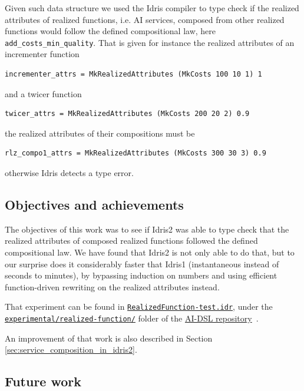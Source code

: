 \documentclass[]{report}
\begin{document}
Given such data structure we used the Idris compiler to type check if
the realized attributes of realized functions, i.e. AI services,
composed from other realized functions would follow the defined
compositional law, here \texttt{add\_costs\_min\_quality}.  That is given
for instance the realized attributes of an incrementer function
\begin{verbatim}
incrementer_attrs = MkRealizedAttributes (MkCosts 100 10 1) 1
\end{verbatim}
and a twicer function
\begin{verbatim}
twicer_attrs = MkRealizedAttributes (MkCosts 200 20 2) 0.9
\end{verbatim}
the realized attributes of their compositions must be
\begin{verbatim}
rlz_compo1_attrs = MkRealizedAttributes (MkCosts 300 30 3) 0.9
\end{verbatim}
otherwise Idris detects a type error.

\subsection{Objectives and achievements}

The objectives of this work was to see if Idris2 was able to type
check that the realized attributes of composed realized functions
followed the defined compositional law.  We have found that Idris2 is
not only able to do that, but to our surprise does it considerably
faster that Idris1 (instantaneous instead of seconds to minutes), by
bypassing induction on numbers and using efficient function-driven
rewriting on the realized attributes instead.

That experiment can be found in
\href{https://github.com/singnet/ai-dsl/blob/master/experimental/realized-function/RealizedFunction-test.idr}{\texttt{RealizedFunction-test.idr}},
under the
\href{https://github.com/singnet/ai-dsl/blob/master/experimental/realized-function/}{\texttt{experimental/realized-function/}}
folder of the \href{https://github.com/singnet/ai-dsl/}{AI-DSL
  repository}~\cite{AIDSLRepo}.

An improvement of that work is also described in Section
\ref{sec:service_composition_in_idris2}.

\subsection{Future work}
\end{document}
